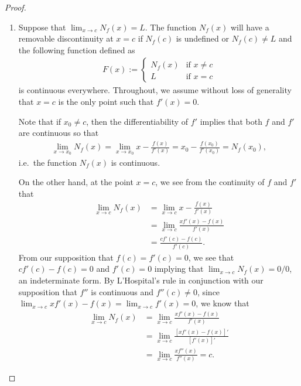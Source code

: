 \begin{proof}
  \begin{enumerate}
    \item Suppose that $\lim_{x\to c} N_f(x) = L$. The function $N_f(x)$ will have a
      removable discontinuity at $x = c$ if $N_f(c)$ is undefined or $N_f(c) \neq L$ and
      the following function defined as
      \begin{align}\label{remove}
        F(x) :=
        \begin{cases}
          N_f(x) & \text{if $x \neq c$}\\
          L & \text{if $x = c$}
        \end{cases}
      \end{align}
      is continuous everywhere. Throughout, we assume without loss of generality that  $x=c$ is the only point such that $f'(x) = 0$.

      Note that if $x_0 \neq c$, then the differentiability of $f'$ implies that both $f$
      and $f'$ are continuous so that
      \begin{align*}
        \lim_{x\to x_0} N_f(x) = \lim_{x\to x_0} x - \frac{f(x)}{f'(x)} = x_0 - \frac{f(x_0)}{f'(x_0)} = N_f(x_0),
      \end{align*}
      i.e.\ the function $N_f(x)$ is continuous.

      On the other hand, at the point $x = c$, we see from the continuity of $f$ and $f'$
      that
      \begin{align*}
        \lim_{x\to c} N_f(x) &= \lim_{x\to c} x - \frac{f(x)}{f'(x)} \\
        &= \lim_{x\to c} \frac{xf'(x) - f(x)}{f'(x)} \\
        &= \frac{c f'(c) - f(c)}{f'(c)}.
      \end{align*}
      From our supposition that $f(c) = f'(c) = 0$, we see that $c f'(c) - f(c) = 0$ and $f'(c) = 0$
      implying that $\lim_{x\to c} N_f(x) = 0/0$, an indeterminate form. By L'Hospital's rule
      in conjunction with our supposition that $f''$ is continuous and $f''(c) \neq 0$,
      since $\lim_{x\to c} x f'(x) - f(x) = \lim_{x\to c} f'(x) = 0$, we know that
      \begin{align*}
        \lim_{x\to c} N_f(x) &= \lim_{x\to c} \frac{xf'(x) - f(x)}{f'(x)} \\
        &= \lim_{x\to c} \frac{[xf'(x) - f(x)]'}{[f'(x)]'} \\
        &= \lim_{x\to c} \frac{x f''(x)}{f''(x)} = c.
      \end{align*}


\end{enumerate}
\end{proof}
